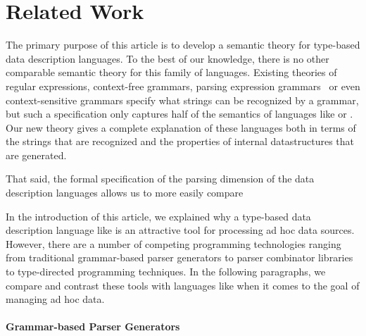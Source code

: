 \section{Related Work}
\label{sec:related}

The primary purpose of this article is to develop a semantic theory
for type-based data description languages.  To the best of our
knowledge, there is no other comparable semantic theory for this
family of languages.  Existing theories of regular expressions,
context-free grammars, parsing expression
grammars~\cite{birman+:parsing,ford:pegs,ford:packrat,grimm:packrat}
or even context-sensitive grammars specify what strings can be
recognized by a grammar, but such a specification 
only captures half of the semantics of
languages like \pads{} or \packettypes{}.  Our new theory gives a
complete explanation of these languages both in terms of the strings
that are recognized and the properties of internal datastructures that
are generated.

That said, the formal specification of the parsing dimension of the data description languages allows us to more easily compare



In the introduction of this article, we explained why a type-based data 
description
language like \pads{} is an attractive tool for processing ad hoc data
sources.  However, there are a number of competing programming 
technologies ranging from traditional grammar-based
parser generators to parser combinator libraries to 
type-directed programming techniques.  In the following paragraphs, 
we compare and contrast these tools with languages like \pads{}
when it comes to the goal of managing ad hoc data.

\paragraph*{Grammar-based Parser Generators}

